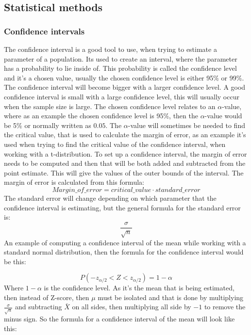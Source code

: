 \subsection{Statistical methods}

\subsubsection{Confidence intervals}
The confidence interval is a good tool to use, when trying to estimate a parameter of a population. Its used to create an interval, where the parameter has a probability to lie inside of. This probability is called the confidence level and it's a chosen value, usually the chosen confidence level is either 95\% or 99\%. The confidence interval will become bigger with a larger confidence level. A good confidence interval is small with a large confidence level, this will usually occur when the sample size is large. The chosen confidence level relates to an $\alpha$-value, where as an example the chosen confidence level is 95\%, then the $\alpha$-value would be 5\% or normally written as $0.05$. The $\alpha$-value will sometimes be needed to find the critical value, that is used to calculate the margin of error, as an example it's used when trying to find the critical value of the confidence interval, when working with a t-distribution.
\newline
To set up a confidence interval, the margin of error needs to be computed and then that will be both added and subtracted from the point estimate. This will give the values of the outer bounds of the interval. The margin of error is calculated from this formula:
$$Margin\_of\_error = critical\_value \cdot standard\_error$$
\newline
The standard error will change depending on which parameter that the confidence interval is estimating, but the general formula for the standard error is:
$$\frac{\sigma}{\sqrt{n}}$$
\newline
An example of computing a confidence interval of the mean while working with a standard normal distribution, then the formula for the confidence interval would be this:

$$P(-z_{\alpha/2}<Z<z_{\alpha/2}) = 1-\alpha$$
\newline
Where $1-\alpha$ is the confidence level. As it's the mean that is being estimated, then instead of Z-score, then $\mu$ must be isolated and that is done by multiplying $\frac{\sigma}{\sqrt{n}}$ and subtracting $\bar{X}$ on all sides, then multiplying all side by $-1$ to remove the minus sign. So the formula for a confidence interval of the mean will look like this:

